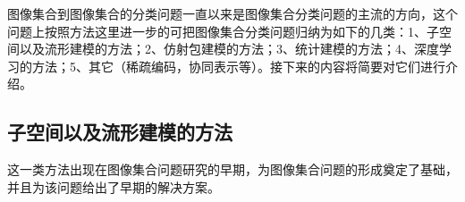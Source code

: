 图像集合到图像集合的分类问题一直以来是图像集合分类问题的主流的方向，这个问题上按照方法这里进一步的可把图像集合分类问题归纳为如下的几类：1、子空间以及流形建模的方法\cite{Subspace_MSM,Subspace_GDA,Manifold_MMD,Manifold_MDA}；2、仿射包建模的方法\cite{Affinehull_AF,Affinehull_SANP,Affinehull_RNP,Affinehull_ProNN}；3、统计建模的方法\cite{Statistics_CDL,Statistics_Vemu,Statistics_SPDML,Statistics_LMKML,Statistics_HERML,Statistics_DARG,Statistics_BeyondGauss}；4、深度学习的方法\cite{Deeplearning_MMDML,Deeplearning_DRM}；5、其它（稀疏编码\cite{Collaborative_ISBCOLREP}，协同表示\cite{Dictionary_DBFR}等）。接下来的内容将简要对它们进行介绍。
\subsection{子空间以及流形建模的方法}
\label{sec:current_Subspace_Manifold}
这一类方法出现在图像集合问题研究的早期，为图像集合问题的形成奠定了基础，并且为该问题给出了早期的解决方案。
